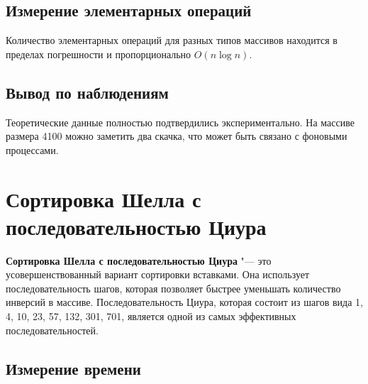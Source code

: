 \documentclass[11pt]{article}
\begin{document}
\subsection{Измерение элементарных операций}

\begin{center}
\end{center}
{ \hspace*{\fill} }

\begin{center}
\end{center}
{ \hspace*{\fill} }

Количество элементарных операций для разных типов массивов находится в пределах погрешности и
пропорционально $O(n\log n)$.

\subsection{Вывод по наблюдениям}

Теоретические данные полностью подтвердились экспериментально. На массиве размера 4100 можно
заметить два скачка, что может быть связано с фоновыми процессами.

\newpage

\setcounter{section}{12}
\section*{\centering Сортировка Шелла с последовательностью Циура}

\textbf{Сортировка Шелла с последовательностью Циура} "--- это усовершенствованный вариант сортировки вставками.
Она использует последовательность шагов, которая позволяет быстрее уменьшать количество инверсий в массиве. Последовательность Циура,
которая состоит из шагов вида 1, 4, 10, 23, 57, 132, 301, 701, является одной из самых эффективных последовательностей.

\setcounter{subsection}{0}
\subsection{Измерение времени}

\begin{center}
\end{center}
{ \hspace*{\fill} }
\end{document}
